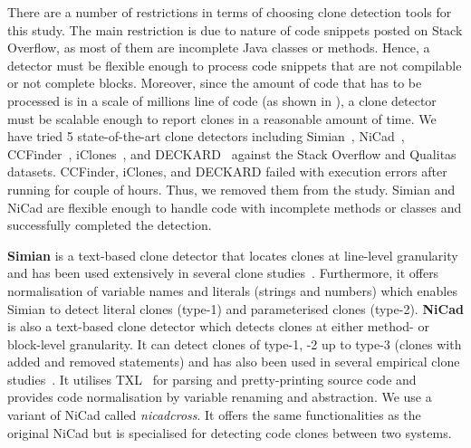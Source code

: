 \documentclass[sigconf,review, anonymous]{acmart}
\begin{document}
There are a number of restrictions in terms of choosing clone
detection tools for this study. The main restriction is due to nature
of code snippets posted on Stack Overflow, as most of them are
incomplete Java classes or methods. Hence, a detector must be flexible
enough to process code snippets that are not compilable or not
complete blocks. Moreover, since the amount of code that has to be
processed is in a scale of millions line of code (as shown in
), a clone detector must be scalable enough to
report clones in a reasonable amount of time. We have tried 5
state-of-the-art clone detectors including Simian~\cite{simian},
NiCad~\cite{Cordy,Roy2008}, CCFinder~\cite{Kamiya2002},
iClones~\cite{Gode2009}, and DECKARD~\cite{Jiang2007a} against the
Stack Overflow and Qualitas datasets. CCFinder, iClones, and DECKARD
failed with execution errors after running for couple of hours. Thus,
we removed them from the study. Simian and NiCad are flexible enough
to handle code with incomplete methods or classes and successfully
completed the detection.

\textbf{Simian} is a text-based clone detector that locates clones at
line-level granularity and has been used extensively in several clone
studies~\cite{Ragkhitwetsagul2016, Wang2013, Mondal2011, Cheung2015,
  Krinke2010}.
Furthermore, it offers normalisation of variable names and literals
(strings and numbers) which enables Simian to detect literal clones
(type-1) and parameterised clones (type-2). \textbf{NiCad} is also a
text-based clone detector which detects clones at either method- or
block-level granularity. It can detect clones of type-1, -2 up to
type-3 (clones with added and removed statements) and has
also been used in several empirical clone studies~\cite{Roy2008,
  Ragkhitwetsagul2016, Svajlenko2014, Wang2013, Mondal2011,
  Sajnani2016}. It utilises TXL~\cite{Cordy2006} for parsing and
pretty-printing source code and provides code normalisation by
variable renaming and abstraction. We use a variant of NiCad called
\textit{nicadcross}. It offers the same functionalities as the
original NiCad but is specialised for detecting code clones between
two systems. 
\end{document}
